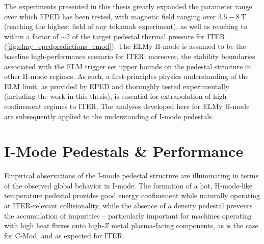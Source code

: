 \documentclass[ twoside,openright,titlepage,numbers=noenddot,headinclude,%
                footinclude=true,cleardoublepage=empty,abstractoff, %
                BCOR=5mm,paper=letter,fontsize=11pt,%
                ngerman,american,%
                ]{scrreprt}
\begin{document}
The experiments presented in this thesis greatly expanded the parameter range over which EPED has been tested, with magnetic field ranging over $3.5-\SI{8}{\tesla}$ (reaching the highest field of any tokamak experiment), as well as reaching to within a factor of $\sim 2$ of the target pedestal thermal pressure for ITER (\cref{fig:elmy_epedpredictions_cmod}).  The ELMy H-mode is assumed to be the baseline high-performance scenario for ITER; moreover, the stability boundaries associated with the ELM trigger set upper bounds on the pedestal structure in other H-mode regimes.  As such, a first-principles physics understanding of the ELM limit, as provided by EPED and thoroughly tested experimentally (including the work in this thesis), is essential for extrapolation of high-confinement regimes to ITER.  The analyses developed here for ELMy H-mode are subsequently applied to the understanding of I-mode pedestals.

\section*{I-Mode Pedestals \& Performance}

Empirical observations of the I-mode pedestal structure are illuminating in terms of the observed global behavior in I-mode.  The formation of a hot, H-mode-like temperature pedestal provides good energy confinement while naturally operating at ITER-relevant collisionality, while the absence of a density pedestal prevents the accumulation of impurities -- particularly important for machines operating with high heat fluxes onto high-$Z$ metal plasma-facing components, as is the case for C-Mod, and as expected for ITER.
\end{document}
